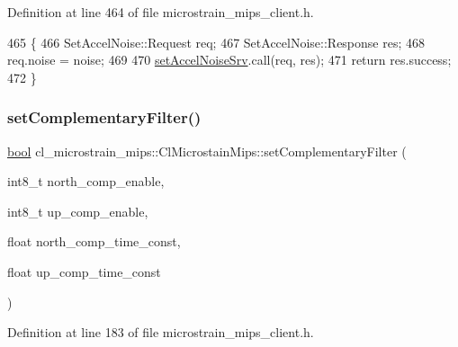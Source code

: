 Definition at line 464 of file microstrain\+\_\+mips\+\_\+client.\+h.


\begin{DoxyCode}
465     \{
466         SetAccelNoise::Request req;
467         SetAccelNoise::Response res;
468         req.noise = noise;
469 
470         \hyperlink{classcl__microstrain__mips_1_1ClMicrostainMips_aed9dd96ff81966ea1fce03173a05bcd8}{setAccelNoiseSrv}.call(req, res);
471         \textcolor{keywordflow}{return} res.success;
472     \}
\end{DoxyCode}
\mbox{\label{classcl__microstrain__mips_1_1ClMicrostainMips_a4dfbed2e601dd990b5fd89fb670656b9}} 
\subsubsection{\texorpdfstring{set\+Complementary\+Filter()}{setComplementaryFilter()}}
{\footnotesize\ttfamily \hyperlink{classbool}{bool} cl\+\_\+microstrain\+\_\+mips\+::\+Cl\+Microstain\+Mips\+::set\+Complementary\+Filter (\begin{DoxyParamCaption}\item[{int8\+\_\+t}]{north\+\_\+comp\+\_\+enable,  }\item[{int8\+\_\+t}]{up\+\_\+comp\+\_\+enable,  }\item[{float}]{north\+\_\+comp\+\_\+time\+\_\+const,  }\item[{float}]{up\+\_\+comp\+\_\+time\+\_\+const }\end{DoxyParamCaption})\hspace{0.3cm}{\ttfamily [inline]}}



Definition at line 183 of file microstrain\+\_\+mips\+\_\+client.\+h.


